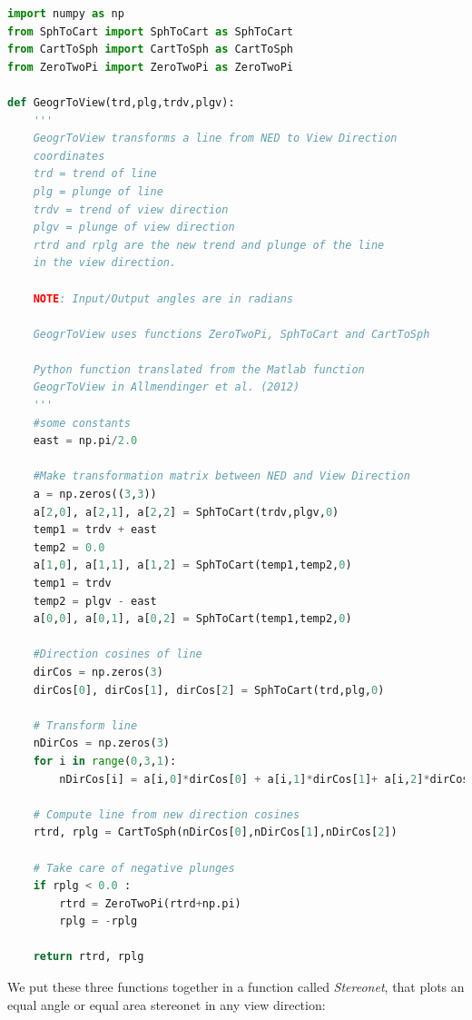 \documentclass[a4paper , 12pt]{book}
\begin{document}
\begin{lstlisting}[language=Python, frame=single]
import numpy as np
from SphToCart import SphToCart as SphToCart
from CartToSph import CartToSph as CartToSph
from ZeroTwoPi import ZeroTwoPi as ZeroTwoPi

def GeogrToView(trd,plg,trdv,plgv):
    '''
	GeogrToView transforms a line from NED to View Direction
	coordinates
	trd = trend of line
   	plg = plunge of line 
   	trdv = trend of view direction 
   	plgv = plunge of view direction 
   	rtrd and rplg are the new trend and plunge of the line 
   	in the view direction.

   	NOTE: Input/Output angles are in radians

   	GeogrToView uses functions ZeroTwoPi, SphToCart and CartToSph

   	Python function translated from the Matlab function 
   	GeogrToView in Allmendinger et al. (2012)
	'''
    #some constants 
    east = np.pi/2.0
    
    #Make transformation matrix between NED and View Direction
    a = np.zeros((3,3))
    a[2,0], a[2,1], a[2,2] = SphToCart(trdv,plgv,0)
    temp1 = trdv + east
    temp2 = 0.0
    a[1,0], a[1,1], a[1,2] = SphToCart(temp1,temp2,0)
    temp1 = trdv
    temp2 = plgv - east
    a[0,0], a[0,1], a[0,2] = SphToCart(temp1,temp2,0)
     
    #Direction cosines of line
    dirCos = np.zeros(3)
    dirCos[0], dirCos[1], dirCos[2] = SphToCart(trd,plg,0)
      
    # Transform line
    nDirCos = np.zeros(3)
    for i in range(0,3,1):
        nDirCos[i] = a[i,0]*dirCos[0] + a[i,1]*dirCos[1]+ a[i,2]*dirCos[2]
    
    # Compute line from new direction cosines
    rtrd, rplg = CartToSph(nDirCos[0],nDirCos[1],nDirCos[2])
    
    # Take care of negative plunges
    if rplg < 0.0 :
        rtrd = ZeroTwoPi(rtrd+np.pi)
        rplg = -rplg
    
    return rtrd, rplg
\end{lstlisting}

We put these three functions together in a function called \textit{Stereonet}, that plots an equal angle or equal area stereonet in any view direction:
\end{document}
